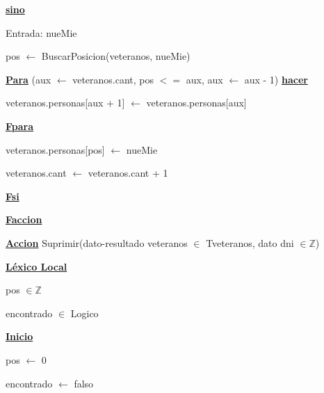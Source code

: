 \documentclass{article}
\begin{document}
            \hspace{12mm}\underline{\textbf{sino}}

                \hspace{16mm}Entrada: nueMie

                \hspace{16mm} pos $\leftarrow$ BuscarPosicion(veteranos, nueMie)

                \hspace{16mm}\underline{\textbf{Para}} (aux $\leftarrow$ veteranos.cant, pos $<=$ aux, aux $\leftarrow$ aux - 1) 
                \underline{\textbf{hacer}}

                    \hspace{20mm}veteranos.personas[aux + 1] $\leftarrow$ veteranos.personas[aux]

                \hspace{16mm}\underline{\textbf{Fpara}}

                \hspace{16mm}veteranos.personas[pos] $\leftarrow$ nueMie

                \hspace{16mm}veteranos.cant $\leftarrow$ veteranos.cant + 1

            \hspace{12mm}\underline{\textbf{Fsi}}

    \hspace{4mm}\underline{\textbf{Faccion}}

    \vspace{4mm}

    \hspace{4mm}\underline{\textbf{Accion}} Suprimir(dato-resultado veteranos $\in$ Tveteranos, dato dni $\in \mathbb{Z}$)

        \hspace{8mm}\underline{\textbf{Léxico Local}}

            \hspace{12mm}pos $\in \mathbb{Z}$

            \hspace{12mm}encontrado $\in$ Logico

        \hspace{8mm}\underline{\textbf{Inicio}}

            \hspace{12mm} pos $\leftarrow$ 0

            \hspace{12mm} encontrado $\leftarrow$ falso
\end{document}

